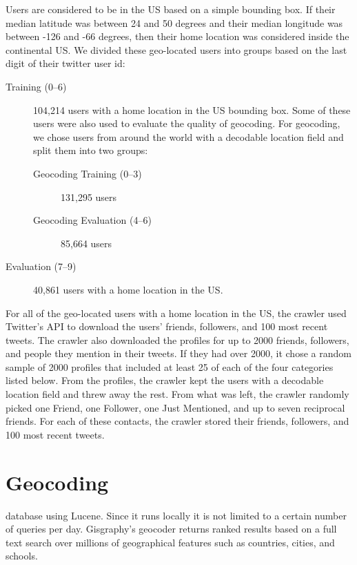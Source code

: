 Users are considered to be in the US based on a simple bounding box.  If their
median latitude was between 24 and 50 degrees and their median longitude was
between -126 and -66 degrees, then their home location was considered inside
the continental US.
We divided these geo-located users into groups based on the last digit of their twitter user id:
\begin{description}
\item[Training (0--6)] 104,214 users with a home location in the US bounding
box. Some of these users were also used to evaluate the quality of geocoding.
For geocoding, we chose users from around the world with a decodable location
field and split them into two groups:
\begin{description}
\item[Geocoding Training (0--3)] 131,295 users
\item[Geocoding Evaluation (4--6)] 85,664 users
\end{description}
\item[Evaluation (7--9)] 40,861 users with a home location in the US.
\end{description}

For all of the geo-located users with a home location in the US, the crawler
used Twitter's API to download the users' friends, followers, and 100 most
recent tweets.
The crawler also downloaded the profiles for up to 2000 friends, followers, and
people they mention in their tweets. If they had over 2000, it chose a random
sample of 2000 profiles that included at least 25 of each of the four
categories listed below.
From the profiles, the crawler kept the users with a decodable location field
and threw away the rest. From what was left, the crawler randomly picked one
Friend, one Follower, one Just Mentioned, and up to seven reciprocal friends.
For each of these contacts, the crawler stored their friends, followers, and 100 most recent tweets.

\section{Geocoding}
database using Lucene. Since
it runs locally it is not limited to a certain number of queries per day.
Gisgraphy's geocoder returns ranked results based on a full text search
over millions of geographical features such as countries, cities, and schools. 

